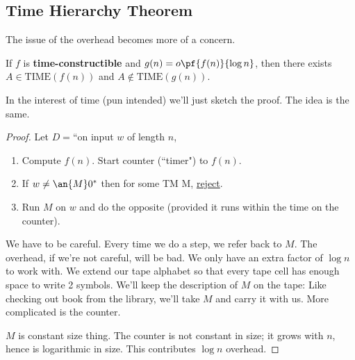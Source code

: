 \subsection{Time Hierarchy Theorem}
The issue of the overhead becomes more of a concern.
\begin{thm}
If $f$ is \textbf{time-constructible} and $g(n)=o\pf{f(n)}{\log n}$, then there exists $A\in \text{TIME}(f(n))$ and $A\nin \text{TIME}(g(n))$. 
\end{thm}
In the interest of time (pun intended) we'll just sketch the proof. The idea is the same.

\begin{proof}
Let $D=$``on input $w$ of length $n$,
\begin{enumerate}
\item
Compute $f(n)$. Start counter (``timer") to $f(n)$. %
\item
If $w\ne \an{M}0^*$ then for some TM M, \ul{reject}.
\item
Run $M$ on $w$ and do the opposite (provided it runs within the time on the counter).
\end{enumerate}
We have to be careful. %
Every time we do a step, we refer back to $M$. The overhead, if we're not careful, will be bad. %
We only have an extra factor of $\log n$ to work with. We extend our tape alphabet so that every tape cell has enough space to write 2 symbols. We'll keep the description of $M$ on the tape: Like checking out book from the library, we'll take $M$ and carry it with us. More complicated is the counter. 

$M$ is constant size thing. The counter is not constant in size; it grows with $n$, hence is logarithmic in size. This contributes $\log n$ overhead.
\end{proof}
